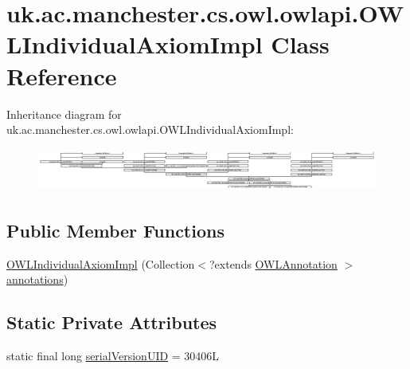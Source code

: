 \hypertarget{classuk_1_1ac_1_1manchester_1_1cs_1_1owl_1_1owlapi_1_1_o_w_l_individual_axiom_impl}{\section{uk.\-ac.\-manchester.\-cs.\-owl.\-owlapi.\-O\-W\-L\-Individual\-Axiom\-Impl Class Reference}
\label{classuk_1_1ac_1_1manchester_1_1cs_1_1owl_1_1owlapi_1_1_o_w_l_individual_axiom_impl}
}
Inheritance diagram for uk.\-ac.\-manchester.\-cs.\-owl.\-owlapi.\-O\-W\-L\-Individual\-Axiom\-Impl\-:\begin{figure}[H]
\begin{center}
\leavevmode
\includegraphics[height=1.435080cm]{classuk_1_1ac_1_1manchester_1_1cs_1_1owl_1_1owlapi_1_1_o_w_l_individual_axiom_impl}
\end{center}
\end{figure}
\subsection*{Public Member Functions}
\begin{DoxyCompactItemize}
\item 
\hyperlink{classuk_1_1ac_1_1manchester_1_1cs_1_1owl_1_1owlapi_1_1_o_w_l_individual_axiom_impl_a5061ef113a3e89df74ac59910e9b7016}{O\-W\-L\-Individual\-Axiom\-Impl} (Collection$<$?extends \hyperlink{interfaceorg_1_1semanticweb_1_1owlapi_1_1model_1_1_o_w_l_annotation}{O\-W\-L\-Annotation} $>$ \hyperlink{classuk_1_1ac_1_1manchester_1_1cs_1_1owl_1_1owlapi_1_1_o_w_l_axiom_impl_af6fbf6188f7bdcdc6bef5766feed695e}{annotations})
\end{DoxyCompactItemize}
\subsection*{Static Private Attributes}
\begin{DoxyCompactItemize}
\item 
static final long \hyperlink{classuk_1_1ac_1_1manchester_1_1cs_1_1owl_1_1owlapi_1_1_o_w_l_individual_axiom_impl_acbbafea8409a405899eff4f38894562a}{serial\-Version\-U\-I\-D} = 30406\-L
\end{DoxyCompactItemize}
